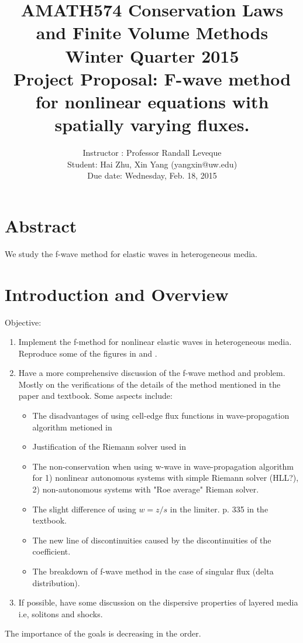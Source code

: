 \documentclass{article}
\begin{document}
\title{AMATH574 Conservation Laws and Finite Volume Methods\\ Winter Quarter 2015\\ Project Proposal: F-wave method for nonlinear equations with spatially varying fluxes.}
\author{Instructor : Professor Randall Leveque\\ Student: Hai Zhu, Xin Yang (yangxin@uw.edu)\\ Due date: Wednesday, Feb. 18, 2015}
\maketitle

\section{Abstract}
We study the f-wave method for elastic waves in heterogeneous media. 
\section{Introduction and Overview}
Objective:\\
\begin{enumerate}
\item Implement the f-method for nonlinear elastic waves in heterogeneous media. Reproduce some of the figures in \cite{bale2002} \cite{leveque2003} and \cite{ketcheson2012}.
\item Have a more comprehensive discussion of the f-wave method and problem. Mostly on the verifications of the details of the method mentioned in the paper and textbook. Some aspects include:
    \begin{itemize}
    \item The disadvantages of using cell-edge flux functions in wave-propagation algorithm metioned in \cite[p. 957]{bale2002}
    \item Justification of the Riemann solver used in \cite[p. 967]{bale2002}
    \item The non-conservation when using w-wave in wave-propagation algorithm for 1) nonlinear autonomous systems with simple Riemann solver (HLL?), 2) non-autonomous systems with "Roe average" Rieman solver.
    \item The slight difference of using $w=z/s$ in the limiter. p. 335 in the textbook.
    \item The new line of discontinuities caused by the discontinuities of the coefficient. \cite[p. 960]{bale2002}
    \item The breakdown of f-wave method in the case of singular flux (delta distribution). \cite[p. 961]{bale2002}
    \end{itemize}
\item If possible, have some discussion on the dispersive properties of layered media i.e, solitons and shocks.
\end{enumerate}
The importance of the goals is decreasing in the order.
\end{document}
